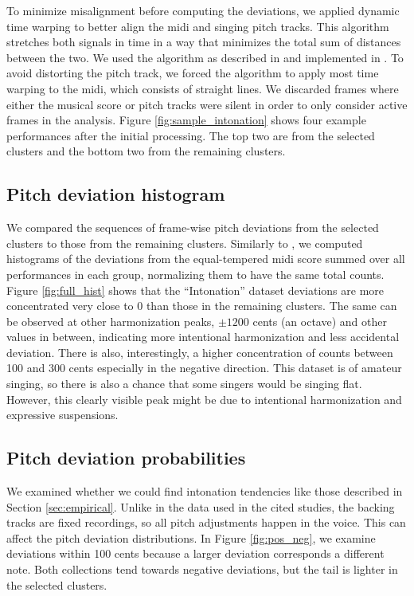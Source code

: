 To minimize misalignment before computing the deviations, we applied dynamic time warping \cite{berndt1994using} to better align the \gls{midi} and singing pitch tracks. This algorithm stretches both signals in time in a way that minimizes the total sum of distances between the two. We used the algorithm as described in \cite{muller2015fundamentals} and implemented in \cite{mcfee2015librosa}. To avoid distorting the pitch track, we forced the algorithm to apply most time warping to the \gls{midi}, which consists of straight lines. We discarded frames where either the musical score or pitch tracks were silent in order to only consider active frames in the analysis. Figure \ref{fig:sample_intonation} shows four example performances after the initial processing. The top two are from the selected clusters and the bottom two from the remaining clusters.

\subsection{Pitch deviation histogram}
We compared the sequences of frame-wise pitch deviations from the selected clusters to those from the remaining clusters. Similarly to \cite{nichols2012automatically}, we computed histograms of the deviations from the equal-tempered \gls{midi} score summed over all performances in each group, normalizing them to have the same total counts. Figure \ref{fig:full_hist} shows that the ``Intonation'' dataset deviations are more concentrated very close to 0 than those in the remaining clusters. The same can be observed at other harmonization peaks, $\pm1200$ cents (an octave) and other values in between, indicating more intentional harmonization and less accidental deviation. There is also, interestingly, a higher concentration of counts between 100 and 300 cents especially in the negative direction. This dataset is of amateur singing, so there is also a chance that some singers would be singing flat. However, this clearly visible peak might be due to intentional harmonization and expressive suspensions. 

\subsection{Pitch deviation probabilities}
We examined whether we could find intonation tendencies like those described in Section \ref{sec:empirical}. Unlike in the data used in the cited studies, the backing tracks are fixed recordings, so all pitch adjustments happen in the voice. This can affect the pitch deviation distributions. In Figure \ref{fig:pos_neg}, we examine deviations within 100 cents because a larger deviation corresponds a different note. Both collections tend towards negative deviations, but the tail is lighter in the selected clusters.

